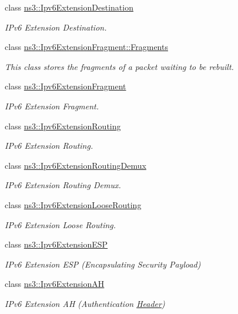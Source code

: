 \begin{DoxyCompactItemize}
class \hyperlink{classns3_1_1Ipv6ExtensionDestination}{ns3\+::\+Ipv6\+Extension\+Destination}
\begin{DoxyCompactList}\small\item\em I\+Pv6 Extension Destination. \end{DoxyCompactList}\item 
class \hyperlink{classns3_1_1Ipv6ExtensionFragment_1_1Fragments}{ns3\+::\+Ipv6\+Extension\+Fragment\+::\+Fragments}
\begin{DoxyCompactList}\small\item\em This class stores the fragments of a packet waiting to be rebuilt. \end{DoxyCompactList}\item 
class \hyperlink{classns3_1_1Ipv6ExtensionFragment}{ns3\+::\+Ipv6\+Extension\+Fragment}
\begin{DoxyCompactList}\small\item\em I\+Pv6 Extension Fragment. \end{DoxyCompactList}\item 
class \hyperlink{classns3_1_1Ipv6ExtensionRouting}{ns3\+::\+Ipv6\+Extension\+Routing}
\begin{DoxyCompactList}\small\item\em I\+Pv6 Extension Routing. \end{DoxyCompactList}\item 
class \hyperlink{classns3_1_1Ipv6ExtensionRoutingDemux}{ns3\+::\+Ipv6\+Extension\+Routing\+Demux}
\begin{DoxyCompactList}\small\item\em I\+Pv6 Extension Routing Demux. \end{DoxyCompactList}\item 
class \hyperlink{classns3_1_1Ipv6ExtensionLooseRouting}{ns3\+::\+Ipv6\+Extension\+Loose\+Routing}
\begin{DoxyCompactList}\small\item\em I\+Pv6 Extension Loose Routing. \end{DoxyCompactList}\item 
class \hyperlink{classns3_1_1Ipv6ExtensionESP}{ns3\+::\+Ipv6\+Extension\+E\+SP}
\begin{DoxyCompactList}\small\item\em I\+Pv6 Extension E\+SP (Encapsulating Security Payload) \end{DoxyCompactList}\item 
class \hyperlink{classns3_1_1Ipv6ExtensionAH}{ns3\+::\+Ipv6\+Extension\+AH}
\begin{DoxyCompactList}\small\item\em I\+Pv6 Extension AH (Authentication \hyperlink{classns3_1_1Header}{Header}) \end{DoxyCompactList}\item 

\end{DoxyCompactItemize}
